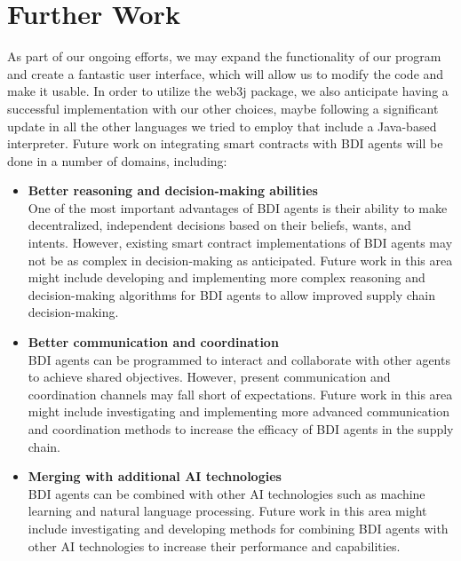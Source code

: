 {\chapter{Further Work}}
As part of our ongoing efforts, we may expand the functionality of our program and create a fantastic user interface, which will allow us to modify the code and make it usable. In order to utilize the web3j package, we also anticipate having a successful implementation with our other choices, maybe following a significant update in all the other languages we tried to employ that include a Java-based interpreter. Future work on integrating smart contracts with \ac{BDI} agents will be done in a number of domains, including:

\begin{itemize}
    \item \textbf{Better reasoning and decision-making abilities} \\ 
    One of the most important advantages of \ac{BDI} agents is their ability to make decentralized, independent decisions based on their beliefs, wants, and intents. However, existing smart contract implementations of \ac{BDI} agents may not be as complex in decision-making as anticipated. Future work in this area might include developing and implementing more complex reasoning and decision-making algorithms for \ac{BDI} agents to allow improved supply chain decision-making.

    \vspace{.5cm}
    
    \item \textbf{Better communication and coordination} \\ 
    \ac{BDI} agents can be programmed to interact and collaborate with other agents to achieve shared objectives. However, present communication and coordination channels may fall short of expectations. Future work in this area might include investigating and implementing more advanced communication and coordination methods to increase the efficacy of \ac{BDI} agents in the supply chain.

    \vspace{.5cm}
    
    \item \textbf{Merging with additional \ac{AI} technologies}\\ 
    \ac{BDI} agents can be combined with other \ac{AI} technologies such as machine learning and natural language processing. Future work in this area might include investigating and developing methods for combining \ac{BDI} agents with other \ac{AI} technologies to increase their performance and capabilities.


\end{itemize}
